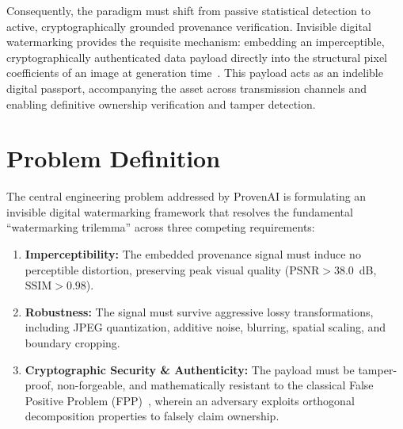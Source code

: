 \documentclass[12pt,a4paper]{report}
\begin{document}
Consequently, the paradigm must shift from passive statistical detection to active, cryptographically grounded provenance verification. Invisible digital watermarking provides the requisite mechanism: embedding an imperceptible, cryptographically authenticated data payload directly into the structural pixel coefficients of an image at generation time~\cite{cox2002digital,fernandez2023stable}. This payload acts as an indelible digital passport, accompanying the asset across transmission channels and enabling definitive ownership verification and tamper detection.

\section{Problem Definition}
The central engineering problem addressed by ProvenAI is formulating an invisible digital watermarking framework that resolves the fundamental ``watermarking trilemma'' across three competing requirements:
\begin{enumerate}
    \item \textbf{Imperceptibility:} The embedded provenance signal must induce no perceptible distortion, preserving peak visual quality ($\text{PSNR} > 38.0$~dB, $\text{SSIM} > 0.98$).
    \item \textbf{Robustness:} The signal must survive aggressive lossy transformations, including JPEG quantization, additive noise, blurring, spatial scaling, and boundary cropping.
    \item \textbf{Cryptographic Security \& Authenticity:} The payload must be tamper-proof, non-forgeable, and mathematically resistant to the classical False Positive Problem (FPP)~\cite{chung2007false}, wherein an adversary exploits orthogonal decomposition properties to falsely claim ownership.
\end{enumerate}
\end{document}
